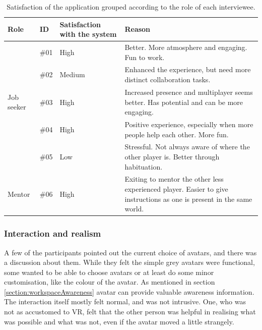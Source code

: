 \begin{table}[!ht]
      \centering
        \begin{tabular}{llp{2.5cm}p{5cm}}
        \toprule
        Role & ID & Satisfaction with the system & Reason\\
        \midrule
         & \#01 & High & Better. More atmosphere and engaging. Fun to work.\\\vspace{0.2cm}
         & \#02  & Medium & Enhanced the experience, but need more distinct collaboration tasks.\\\vspace{0.2cm}
         Job seeker & \#03  & High & Increased presence and multiplayer seems better. Has potential and can be more engaging.\\\vspace{0.2cm}
         & \#04 & High & Positive experience, especially when more people help each other. More fun.  \\\vspace{0.2cm}
         & \#05  & Low & Stressful. Not always aware of where the other player is. Better through habituation. \\\midrule
        Mentor & \#06  & High &  Exiting to mentor the other less experienced player. Easier to give instructions as one is present in the same world. \\
        \bottomrule
        \end{tabular}
        \caption{Satisfaction of the application grouped according to the role of each interviewee.}
        \label{table:satificationInterview1}
\end{table}


\subsubsection{Interaction and realism}
A few of the participants pointed out the current choice of avatars, and there was a discussion about them. While they felt the simple grey avatars were functional, some wanted to be able to choose avatars or at least do some minor customisation, like the colour of the avatar. As mentioned in section \ref{section:workspaceAwareness} avatar can provide valuable awareness information. The interaction itself mostly felt normal, and was not intrusive. One, who was not as accustomed to VR, felt that the other person was helpful in realising what was possible and what was not, even if the avatar moved a little strangely.

